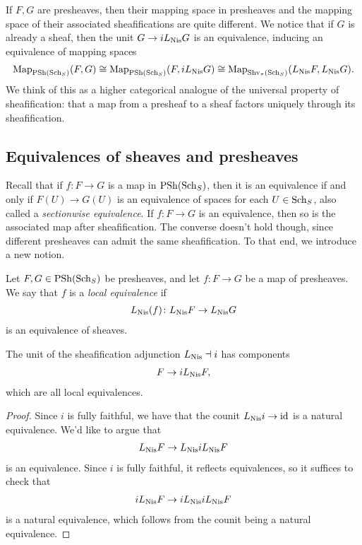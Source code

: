 \documentclass[11pt]{amsart}
\renewcommand{\Pre}{\mathrm{PSh}}
\begin{document}
\begin{remark} If $F,G$ are presheaves, then their mapping space in presheaves and the mapping space of their associated sheafifications are quite different. We notice that if $G$ is already a sheaf, then the unit $G \to i L_{\mathrm{Nis}} G$ is an equivalence, inducing an equivalence of mapping spaces
\begin{align*}
    \Map_{\Pre(\Sch_S)}(F,G) \cong \Map_{\Pre(\Sch_S)}(F, i L_\Nis G) \cong \Map_{\Shv_\tau(\Sch_S)}(L_\Nis F, L_\Nis G).
\end{align*}
We think of this as a higher categorical analogue of the universal property of sheafification: that a map from a presheaf to a sheaf factors uniquely through its sheafification.
\end{remark}



\subsection{Equivalences of sheaves and presheaves}

Recall that if $f\colon F \to G$ is a map in $\Pre(\Sch_S)$, then it is an equivalence if and only if $F(U) \to G(U)$ is an equivalence of spaces for each $U \in \mathrm{Sch}_S$, also called a \textit{sectionwise equivalence}. If $f\colon F \to G$ is an equivalence, then so is the associated map after sheafification. The converse doesn't hold though, since different presheaves can admit the same sheafification. To that end, we introduce a new notion.

\begin{definition} Let $F,G\in \Pre(\Sch_S)$ be presheaves, and let $f \colon F \to G$ be a map of presheaves. We say that $f$ is a \textit{local equivalence} if
\begin{align*}
    L_{\mathrm{Nis}} (f) \colon L_{\mathrm{Nis}} F \to L_{\mathrm{Nis}} G
\end{align*}
is an equivalence of sheaves.
\end{definition}

\begin{example}\label{exa:sheafification-local-equivalence}
The unit of the sheafification adjunction $L_{\mathrm{Nis}} \dashv i$ has components
\begin{align*}
    F \to i L_{\mathrm{Nis}} F,
\end{align*}
which are all local equivalences.
\end{example}
\begin{proof} Since $i$ is fully faithful, we have that the counit $L_{\mathrm{Nis}} i \to \mathrm{id}$ is a natural equivalence. We'd like to argue that
\begin{align*}
    L_{\mathrm{Nis}} F \to L_{\mathrm{Nis}} i L_{\mathrm{Nis}} F
\end{align*}
is an equivalence. Since $i$ is fully faithful, it reflects equivalences, so it suffices to check that
\begin{align*}
    i L_{\mathrm{Nis}} F \to i L_{\mathrm{Nis}} i L_{\mathrm{Nis}} F
\end{align*}
is a natural equivalence, which follows from the counit being a natural equivalence.
\end{proof}
\end{document}
